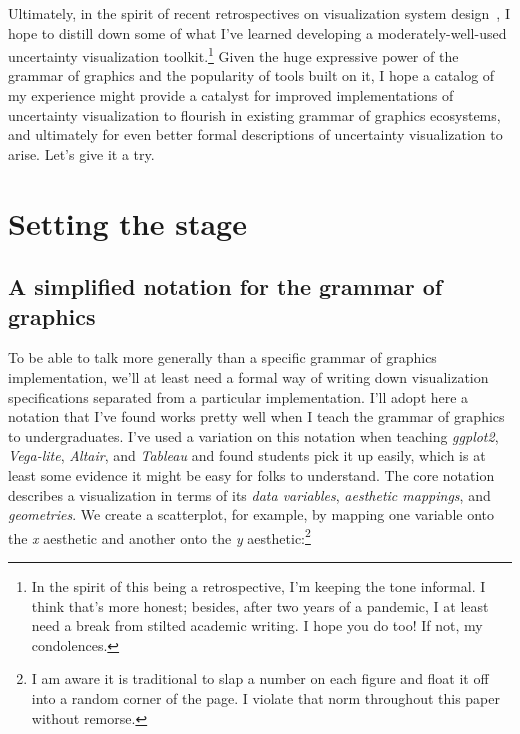 \documentclass[journal]{vgtc}                     %
\begin{document}
Ultimately, in the spirit of recent retrospectives on visualization system design~\cite{satyanarayan2019critical}, I hope to distill down some of what I've learned developing a moderately-well-used uncertainty visualization toolkit.\footnote{In the spirit of this being a retrospective, I'm keeping the tone informal. I think that's more honest; besides, after two years of a pandemic, I at least need a break from stilted academic writing. I hope you do too! If not, my condolences.} 
Given the huge expressive power of the grammar of graphics and the popularity of tools built on it, I hope a catalog of my experience might provide a catalyst for improved implementations of uncertainty visualization to flourish in existing grammar of graphics ecosystems, and ultimately for even better formal descriptions of uncertainty visualization to arise. Let's give it a try.

\section{Setting the stage}

\subsection{A simplified notation for the grammar of graphics}

To be able to talk more generally than a specific grammar of graphics implementation, we'll at least need a formal way of writing down visualization specifications separated from a particular implementation. I'll adopt here a notation that I've found works pretty well when I teach the grammar of graphics to undergraduates. I've used a variation on this notation when teaching \textit{ggplot2}, \textit{Vega-lite}, \textit{Altair}, and \textit{Tableau} and found students pick it up easily, which is at least some evidence it might be easy for folks to understand. The core notation describes a visualization in terms of its \textit{data variables}, \textit{aesthetic mappings}, and \textit{geometries}. We create a scatterplot, for example, by mapping one variable onto the \textit{x} aesthetic and another onto the \textit{y} aesthetic:\footnote{I am aware it is traditional to slap a number on each figure and float it off into a random corner of the page. I violate that norm throughout this paper without remorse.}
\end{document}
